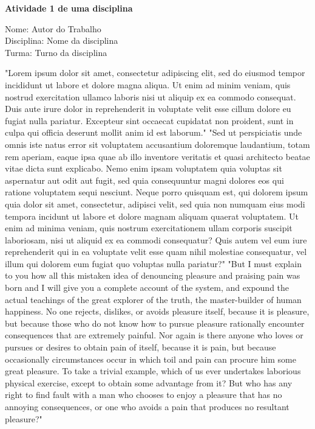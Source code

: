 \documentclass[12pt, a4paper]{article}
\begin{document}
\begin{center}
{\large\textbf{Atividade 1 de uma disciplina}}
\end{center}

\vspace{0.5cm}

\begin{flushleft}
Nome: Autor do Trabalho \\
Disciplina: Nome da disciplina \\
Turma: Turno da disciplina \\
\end{flushleft}

\begin{multicols}{2}
"Lorem ipsum dolor sit amet, consectetur adipiscing elit, sed do eiusmod tempor incididunt ut labore et dolore magna aliqua. Ut enim ad minim veniam, quis nostrud exercitation ullamco laboris nisi ut aliquip ex ea commodo consequat. Duis aute irure dolor in reprehenderit in voluptate velit esse cillum dolore eu fugiat nulla pariatur. Excepteur sint occaecat cupidatat non proident, sunt in culpa qui officia deserunt mollit anim id est laborum."
"Sed ut perspiciatis unde omnis iste natus error sit voluptatem accusantium doloremque laudantium, totam rem aperiam, eaque ipsa quae ab illo inventore veritatis et quasi architecto beatae vitae dicta sunt explicabo. Nemo enim ipsam voluptatem quia voluptas sit aspernatur aut odit aut fugit, sed quia consequuntur magni dolores eos qui ratione voluptatem sequi nesciunt. Neque porro quisquam est, qui dolorem ipsum quia dolor sit amet, consectetur, adipisci velit, sed quia non numquam eius modi tempora incidunt ut labore et dolore magnam aliquam quaerat voluptatem. Ut enim ad minima veniam, quis nostrum exercitationem ullam corporis suscipit laboriosam, nisi ut aliquid ex ea commodi consequatur? Quis autem vel eum iure reprehenderit qui in ea voluptate velit esse quam nihil molestiae consequatur, vel illum qui dolorem eum fugiat quo voluptas nulla pariatur?"
"But I must explain to you how all this mistaken idea of denouncing pleasure and praising pain was born and I will give you a complete account of the system, and expound the actual teachings of the great explorer of the truth, the master-builder of human happiness. No one rejects, dislikes, or avoids pleasure itself, because it is pleasure, but because those who do not know how to pursue pleasure rationally encounter consequences that are extremely painful. Nor again is there anyone who loves or pursues or desires to obtain pain of itself, because it is pain, but because occasionally circumstances occur in which toil and pain can procure him some great pleasure. To take a trivial example, which of us ever undertakes laborious physical exercise, except to obtain some advantage from it? But who has any right to find fault with a man who chooses to enjoy a pleasure that has no annoying consequences, or one who avoids a pain that produces no resultant pleasure?"

\end{multicols}
\end{document}
